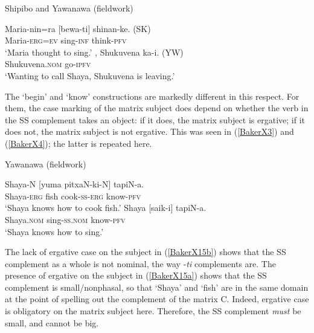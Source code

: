 \documentclass[output=paper]{langscibook}
\begin{document}
\begin{exe}
\ex Shipibo and Yawanawa (fieldwork) \label{BakerX14}
    \begin{xlist}
    \ex \label{BakerX14a}
		\gll Maria-nin=ra [bewa-ti] shinan-ke. (SK)\\
			 Maria-\textsc{erg=ev} sing-\textsc{inf} think-\textsc{pfv}\\
		    \glt `Maria thought to sing.'
	\ex \label{BakerX14b}
		, Shukuvena ka-i. (YW)\\
			 [(he) Shaya call-\textsc{des-ss.nom}] Shukuvena.\textsc{nom} go-\textsc{ipfv}\\
		    \glt `Wanting to call Shaya, Shukuvena is leaving.'
    \end{xlist}
\end{exe}

The `begin' and `know' constructions are markedly different in this respect. For them, the case marking of the matrix subject does depend on whether the verb in the SS complement takes an object: if it does, the matrix subject is ergative; if it does not, the matrix subject is not ergative. This was seen in (\ref{BakerX3}) and (\ref{BakerX4}); the latter is repeated here.

\begin{exe}
\ex Yawanawa (fieldwork) \label{BakerX15}
    \begin{xlist}
		\ex \label{BakerX15a}
		\gll Shaya-N [yuma pitxaN-ki-N] tapiN-a.\\
		     Shaya-\textsc{erg} fish cook-\textsc{ss-erg} know-\textsc{pfv}\\
		    \glt `Shaya knows how to cook fish.'
		\ex \label{BakerX15b}
		\gll Shaya [saik-i] tapiN-a.\\
			 Shaya.\textsc{nom} sing-\textsc{ss.nom} know-\textsc{pfv}\\
		    \glt `Shaya knows how to sing.'
	\end{xlist}
\end{exe}


The lack of ergative case on the subject in (\ref{BakerX15b}) shows that the SS complement as a whole is not nominal, the way -\textit{ti} complements are. The presence of ergative on the subject in (\ref{BakerX15a}) shows that the SS complement is small/nonphasal, so that ‘Shaya’ and ‘fish’ are in the same domain at the point of spelling out the complement of the matrix C. Indeed, ergative case is obligatory on the matrix subject here. Therefore, the SS complement \textit{must} be small, and cannot be big.
\end{document}
